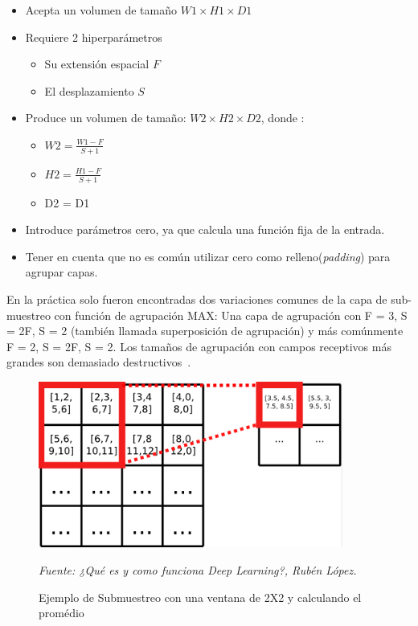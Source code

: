 \begin{itemize}
\item Acepta un volumen de tamaño $W1\times H1\times D1$
\item Requiere 2 hiperparámetros
  \begin{itemize}
  \item Su extensión espacial $F$
  \item El desplazamiento $S$
  \end{itemize}
\item Produce un volumen de tamaño: $W2\times H2\times D2$, donde :
  \begin{itemize}
  \item $W2 =  \frac{W1 - F}{S + 1}$
  \item $H2 = \frac{H1 - F}{S + 1}$
  
  \item D2 = D1
  \end{itemize}
\item Introduce parámetros cero, ya que calcula una función fija de la entrada.
\item Tener en cuenta que no es común utilizar cero como relleno(\textit{padding}) para agrupar capas.
\end{itemize}

En la práctica solo fueron encontradas dos variaciones comunes de la capa de sub-muestreo con función de agrupación MAX: Una capa de agrupación con F = 3, S = 2F, S = 2 (también llamada superposición de agrupación) y más comúnmente F = 2, S = 2F, S = 2. Los tamaños de agrupación con campos receptivos más grandes son demasiado destructivos~\cite{22RedesNeuronalesConvolu}.

\begin{figure}[H]
		\centering
		\includegraphics[width=100mm]{./Imagenes/submuestre.png}
		\caption{Ejemplo de Submuestreo con una ventana de 2X2 y calculando el promédio}
		\vspace{0.15cm}
		\textit{Fuente: ¿Qué es y como funciona Deep Learning?, Rubén López.}
        \label{fig:submuestre}
\end{figure}


